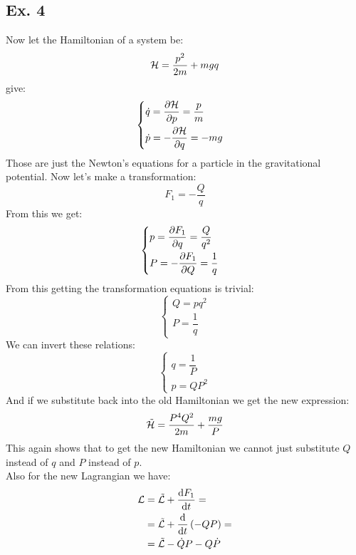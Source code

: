 \subsection{Ex. 4}
Now let the Hamiltonian of a system be:
\begin{equation}
    \mathcal{H} = \dfrac{p^2}{2m} + mgq
\end{equation}
\hamiltonref\;give:
\begin{equation}
    \begin{cases}
        \dot{q} = \pdv{\hamfun}{p} = \dfrac{p}{m}\\[8pt]
        \dot{p} = -\pdv{\hamfun}{q} = -mg
    \end{cases}
\end{equation}
Those are just the Newton's equations for a particle in the gravitational potential. Now let's make a transformation:
\begin{equation}
    F_1 = -\dfrac{Q}{q}
\end{equation}
From this we get:
\begin{equation}
    \begin{cases}
        p = \pdv{F_1}{q} = \dfrac{Q}{q^2}\\[8pt]
        P = -\pdv{F_1}{Q} = \dfrac{1}{q}
    \end{cases}
\end{equation}
From this getting the transformation equations is trivial:
\begin{equation}
    \begin{cases}
        Q = pq^2\\[8pt]
        P = \dfrac{1}{q}
    \end{cases}
\end{equation}
We can invert these relations:
\begin{equation}
    \begin{cases}
        q = \dfrac{1}{P}\\
        p = QP^2
    \end{cases}
\end{equation}
And if we substitute back into the old Hamiltonian we get the new expression:
\begin{equation}
    \tilde{\mathcal{H}} = \dfrac{P^4 Q^2}{2m} + \dfrac{mg}{P}
\end{equation}
This again shows that to get the new Hamiltonian we cannot just substitute $Q$ instead of $q$ and $P$ instead of $p$.\\
Also for the new Lagrangian we have:
\begin{equation}
    \begin{split}
        \lagr &= \tilde{\lagr} + \dv{F_1}{t} =\\
        &= \tilde{\lagr} + \dv{}{t}\brackets{-QP} =\\
        &=\tilde{\lagr} - \dot{Q}P - Q\dot{P}
    \end{split}
\end{equation}
